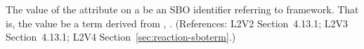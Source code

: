 The value of the  attribute on a \Reaction {}
be an SBO identifier referring to  framework.  That
is, the value  be a term derived from \sbointeractionID,
.  (References: L2V2 Section~4.13.1; L2V3
Section~4.13.1; L2V4 Section~\ref{sec:reaction-sboterm}.)

